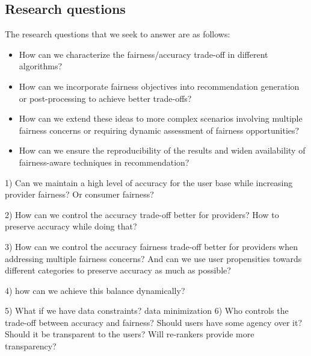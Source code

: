 \subsection{Research questions}

The research questions that we seek to answer are as follows:

\begin{itemize}
    \item How can we characterize the fairness/accuracy trade-off in different algorithms?
    \item How can we incorporate fairness objectives into recommendation generation or post-processing to achieve better trade-offs? %
    \item How can we extend these ideas to more complex scenarios involving multiple fairness concerns or requiring dynamic assessment of fairness opportunities? %
    \item How can we ensure the reproducibility of the results and widen availability of fairness-aware techniques in recommendation? %
\end{itemize}















1) Can we maintain a high level of accuracy for the user base while increasing provider fairness? Or consumer fairness?

2) How can we control the accuracy trade-off better for providers? How to preserve accuracy while doing that? 

3) How can we control the accuracy fairness trade-off better for providers when addressing multiple fairness concerns? And can we use user propensities towards different categories to preserve accuracy as much as possible?

4) how can we achieve this balance dynamically?

5) What if we have data constraints? data minimization
6) Who controls the trade-off between accuracy and fairness? Should users have some agency over it? Should it be transparent to the users? Will re-rankers provide more transparency?





